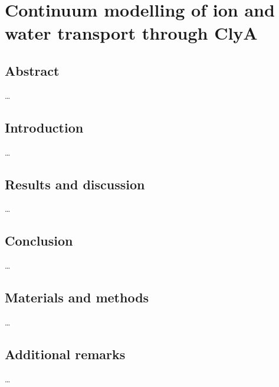 \chapter{Continuum modelling of ion and water transport through ClyA}

\section{Abstract}
\ldots
\section{Introduction}
\ldots
\section{Results and discussion}
\ldots
\section{Conclusion}
\ldots
\section{Materials and methods}
\ldots
\section{Additional remarks}
\ldots




